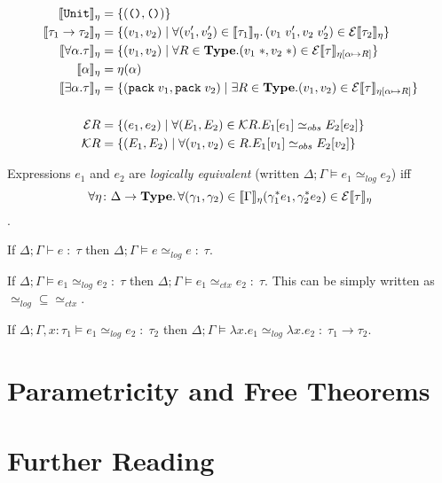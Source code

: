 \begin{alignat*}{2}
  \llbracket\texttt{Unit}\rrbracket_{\eta} & = \{ (\texttt{()}, \texttt{()}) \} \\
  \llbracket\tau_1 \to \tau_2\rrbracket_{\eta} & = \{ (v_1, v_2) \mid
    \forall (v_1', v_2') \in \llbracket\tau_1\rrbracket_{\eta}\ldotp
    (v_1\;v_1', v_2\;v_2' ) \in \mathcal{E}\llbracket\tau_2\rrbracket_{\eta} \} \\
  \llbracket\forall\alpha.\tau\rrbracket_{\eta} & = \{ (v_1, v_2) \mid \forall R \in \textbf{Type}.
    (v_1\;*, v_2\;*) \in \mathcal{E}\llbracket\tau\rrbracket_{\eta[\alpha \mapsto R]} \} \\
  \llbracket\alpha\rrbracket_{\eta} & = \eta(\alpha) \\
  \llbracket\exists\alpha.\tau\rrbracket_{\eta} & =
    \{ (\texttt{pack}\;v_1,\texttt{pack}\;v_2) \mid \exists R \in \textbf{Type}.
    (v_1, v_2) \in \mathcal{E}\llbracket\tau\rrbracket_{\eta[\alpha \mapsto R]} \} \\\\
  \mathcal{E}R & = \{ (e_1, e_2) \mid \forall (E_1, E_2) \in \mathcal{K} R. E_1[e_1] \simeq_{obs}  E_2[e_2]\}\\
  \mathcal{K}R & = \{ (E_1, E_2) \mid \forall (v_1, v_2) \in R. E_1[v_1] \simeq_{obs}  E_2[v_2]\}\\
\end{alignat*}


\begin{defin}
  Expressions $e_1$ and $e_2$ are \emph{logically equivalent}
  (written $\Delta; \Gamma \models e_1 \simeq_{log} e_2$)
  iff
  \[
    \forall \eta \colon \Delta \to \textbf{Type}\ldotp
    \forall (\gamma_1, \gamma_2) \in \llbracket\Gamma\rrbracket_{\eta} \\
    (\gamma_1^*e_1, \gamma_2^*e_2) \in \mathcal{E}\llbracket\tau\rrbracket_{\eta}
  \].
\end{defin}

\begin{theorem}
  If $\Delta; \Gamma \vdash e \;:\; \tau$ then $\Delta; \Gamma \models e \simeq_{log} e \;:\; \tau$.
\end{theorem}

\begin{theorem}[Soundness]
  If $\Delta; \Gamma \models e_1 \simeq_{log} e_2 \;:\; \tau$
  then $\Delta; \Gamma \models e_1 \simeq_{ctx} e_2 \;:\; \tau$.
  This can be simply written as $\simeq_{log} \subseteq \simeq_{ctx}$.
\end{theorem}

\begin{lemma}
  If $\Delta; \Gamma, x : \tau_1 \models e_1 \simeq_{log} e_2 \;:\; \tau_2$ then
  $\Delta; \Gamma \models \lambda x.e_1 \simeq_{log} \lambda x.e_2 \;:\; \tau_1 \to \tau_2$.
\end{lemma}

\section{Parametricity and Free Theorems}

\section{Further Reading}
